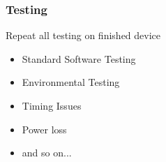 \documentclass{beamer}
\begin{document}
       \begin{frame}
       	\frametitle{Testing}
       	Repeat all testing on finished device
       	\begin{itemize}
       		
       		\item Standard Software Testing
       		\item Environmental Testing
       		\item Timing Issues
       		\item Power loss
       		\item and so on...
       		
       	\end{itemize}
       	
       \end{frame} 
          
\end{document}
